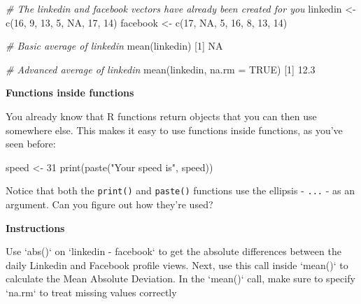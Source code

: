 \documentclass[]{article}
\newcommand{\hlnum}[1]{\textcolor[rgb]{0.816,0.125,0.439}{#1}}%
\newcommand{\hlstr}[1]{\textcolor[rgb]{0.251,0.627,0.251}{#1}}%
\newcommand{\hlcom}[1]{\textcolor[rgb]{0.502,0.502,0.502}{\textit{#1}}}%
\newcommand{\hlstd}[1]{\textcolor[rgb]{0.251,0.251,0.251}{#1}}%
\newcommand{\hlkwc}[1]{\textcolor[rgb]{0.251,0.251,0.251}{#1}}%
\newcommand{\hlkwd}[1]{\textcolor[rgb]{0.878,0.439,0.125}{#1}}%
\newenvironment{Shaded}{\begin{myshaded}}{\end{myshaded}}
\newcommand{\KeywordTok}[1]{\hlkwd{#1}}
\newcommand{\DataTypeTok}[1]{\hlkwc{#1}}
\newcommand{\DecValTok}[1]{\hlnum{#1}}
\newcommand{\FloatTok}[1]{\hlnum{#1}}
\newcommand{\StringTok}[1]{\hlstr{#1}}
\newcommand{\CommentTok}[1]{\hlcom{#1}}
\newcommand{\OtherTok}[1]{{#1}}
\newcommand{\NormalTok}[1]{\hlstd{#1}}
\begin{document}
\begin{Shaded}
\begin{Highlighting}[]
\CommentTok{# The linkedin and facebook vectors have already been created for you}
\NormalTok{linkedin <-}\StringTok{ }\KeywordTok{c}\NormalTok{(}\DecValTok{16}\NormalTok{, }\DecValTok{9}\NormalTok{, }\DecValTok{13}\NormalTok{, }\DecValTok{5}\NormalTok{, }\OtherTok{NA}\NormalTok{, }\DecValTok{17}\NormalTok{, }\DecValTok{14}\NormalTok{)}
\NormalTok{facebook <-}\StringTok{ }\KeywordTok{c}\NormalTok{(}\DecValTok{17}\NormalTok{, }\OtherTok{NA}\NormalTok{, }\DecValTok{5}\NormalTok{, }\DecValTok{16}\NormalTok{, }\DecValTok{8}\NormalTok{, }\DecValTok{13}\NormalTok{, }\DecValTok{14}\NormalTok{)}

\CommentTok{# Basic average of linkedin}
\KeywordTok{mean}\NormalTok{(linkedin)}
\NormalTok{   [}\DecValTok{1}\NormalTok{] }\OtherTok{NA}

\CommentTok{# Advanced average of linkedin}
\KeywordTok{mean}\NormalTok{(linkedin, }\DataTypeTok{na.rm =} \OtherTok{TRUE}\NormalTok{)}
\NormalTok{   [}\DecValTok{1}\NormalTok{] }\FloatTok{12.3}
\end{Highlighting}
\end{Shaded}

\textbf{Functions inside functions}

You already know that R functions return objects that you can then use
somewhere else. This makes it easy to use functions inside functions, as
you've seen before:

\begin{Shaded}
\begin{Highlighting}[]
\NormalTok{speed <-}\StringTok{ }\DecValTok{31}
\KeywordTok{print}\NormalTok{(}\KeywordTok{paste}\NormalTok{(}\StringTok{"Your speed is"}\NormalTok{, speed))}
\end{Highlighting}
\end{Shaded}

Notice that both the \texttt{print()} and \texttt{paste()} functions use
the ellipsis - \texttt{...} - as an argument. Can you figure out how
they're used?

\textbf{Instructions}

\begin{Shaded}
\begin{Highlighting}[]
\NormalTok{Use }\StringTok{`}\DataTypeTok{abs()}\StringTok{`}\NormalTok{ on }\StringTok{`}\DataTypeTok{linkedin - facebook}\StringTok{`}\NormalTok{ to get the absolute differences between the daily Linkedin and Facebook profile views. Next, use this }\NormalTok{ call inside }\StringTok{`}\DataTypeTok{mean()}\StringTok{`}\NormalTok{ to calculate the Mean Absolute Deviation. In the }\StringTok{`}\DataTypeTok{mean()}\StringTok{`}\NormalTok{ call, make sure to specify }\StringTok{`}\DataTypeTok{na.rm}\StringTok{`}\NormalTok{ to treat missing values correctly}\OperatorTok{!}
\end{Highlighting}
\end{Shaded}
\end{document}

